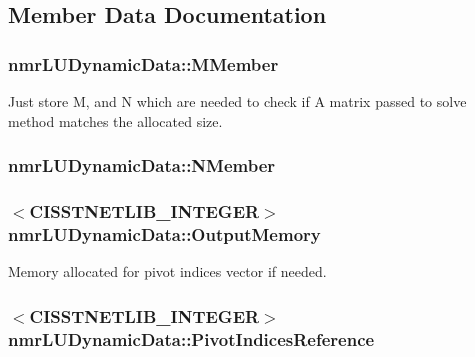 \subsection{Member Data Documentation}
\hypertarget{classnmr_l_u_dynamic_data_a859065b13cb287c4e0e67be01f9a779b}{
\subsubsection[{M\-Member}]{ nmr\-L\-U\-Dynamic\-Data\-::\-M\-Member\hspace{0.3cm}{\ttfamily [protected]}}}\label{classnmr_l_u_dynamic_data_a859065b13cb287c4e0e67be01f9a779b}
Just store M, and N which are needed to check if A matrix passed to solve method matches the allocated size. \hypertarget{classnmr_l_u_dynamic_data_a44878cc0e7c2c01ea964a57d447b64bb}{
\subsubsection[{N\-Member}]{ nmr\-L\-U\-Dynamic\-Data\-::\-N\-Member\hspace{0.3cm}{\ttfamily [protected]}}}\label{classnmr_l_u_dynamic_data_a44878cc0e7c2c01ea964a57d447b64bb}
\hypertarget{classnmr_l_u_dynamic_data_acf9e9d0bb436f0e04c6d6138b1cbd8fd}{
\subsubsection[{Output\-Memory}]{$<$C\-I\-S\-S\-T\-N\-E\-T\-L\-I\-B\-\_\-\-I\-N\-T\-E\-G\-E\-R$>$ nmr\-L\-U\-Dynamic\-Data\-::\-Output\-Memory\hspace{0.3cm}{\ttfamily [protected]}}}\label{classnmr_l_u_dynamic_data_acf9e9d0bb436f0e04c6d6138b1cbd8fd}
Memory allocated for pivot indices vector if needed. \hypertarget{classnmr_l_u_dynamic_data_a45c056cf29f16a5e97fafee6484a009e}{
\subsubsection[{Pivot\-Indices\-Reference}]{$<$C\-I\-S\-S\-T\-N\-E\-T\-L\-I\-B\-\_\-\-I\-N\-T\-E\-G\-E\-R$>$ nmr\-L\-U\-Dynamic\-Data\-::\-Pivot\-Indices\-Reference\hspace{0.3cm}{\ttfamily [protected]}}}\label{classnmr_l_u_dynamic_data_a45c056cf29f16a5e97fafee6484a009e}
